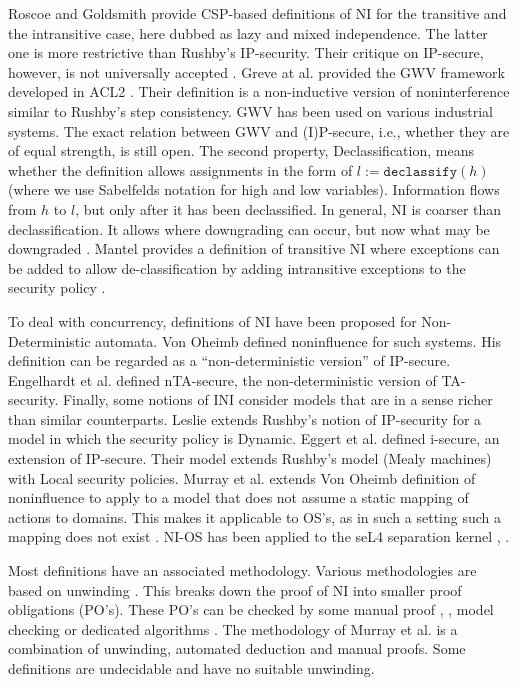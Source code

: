 \documentclass[11pt,a4paper]{article}
\begin{document}
Roscoe and Goldsmith provide CSP-based definitions of NI for the transitive and 
the intransitive case, here dubbed as lazy and mixed independence. The latter 
one is more restrictive than Rushby's IP-security. Their critique on IP-secure, 
however, is not universally accepted \cite{SKIPaper19}.
 Greve at al. provided the GWV framework 
developed in ACL2 \cite{SKIPaper7}. Their definition is a non-inductive version of 
noninterference similar to Rushby's step consistency. GWV has been used on 
various industrial systems. The exact relation between GWV and (I)P-secure, 
i.e., whether they are of equal strength, is still open.
The second property, 
Declassification, means whether the definition allows assignments in the form 
of $l := \texttt{declassify}(h)$ (where we use Sabelfelds \cite{SKIPaper6} notation for 
high and low variables). Information flows from $h$ to $l$, but only after it has 
been declassified. In general, NI is coarser than declassification. It allows 
where downgrading can occur, but now what may be downgraded \cite{SKIPaper15}. Mantel 
provides a definition of transitive NI where exceptions can be added to allow 
de-classification by adding intransitive exceptions to the security policy \cite{SKIPaper15}.

To deal with concurrency, definitions of NI have been proposed for 
Non-Deterministic automata. Von Oheimb defined noninfluence for such systems. 
His definition can be regarded as a ``non-deterministic version'' of IP-secure. 
Engelhardt et al. defined nTA-secure, the non-deterministic version of 
TA-security.
Finally, some notions of INI consider models that are in a sense 
richer than similar counterparts. Leslie extends Rushby's notion of IP-security 
for a model in which the security policy is Dynamic. Eggert et al. defined 
i-secure, an extension of IP-secure. Their model extends Rushby's model 
(Mealy machines) with Local security policies. Murray et al. extends Von Oheimb 
definition of noninfluence to apply to a model that 
does not assume a static mapping of actions to domains. 
This makes
 it applicable to OS's, as in such a setting such a mapping does not 
exist \cite{Murray_MBGK_12}. NI-OS has been applied to the seL4 separation kernel 
\cite{Murray_MBGK_12}, \cite{Klein:2009:SFV:1629575.1629596}.
 
Most definitions have an associated methodology. Various methodologies are 
based on unwinding \cite{SKIPaper14}. This breaks down the proof of NI into smaller 
proof obligations (PO's). These PO's can be checked by some manual proof 
\cite{rushby92}, \cite{SKIPaper32}, model checking \cite{SKIPaper21} or dedicated 
algorithms \cite{SKIPaper20}. The methodology of 
Murray et al. is a combination of unwinding, automated deduction and manual
proofs. Some definitions are undecidable 
and have no suitable unwinding.
\end{document}

